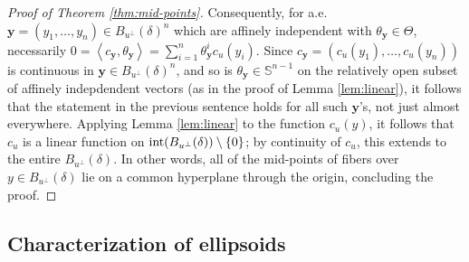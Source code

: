 \documentclass[11pt]{article}
\theoremstyle{definition}
\theoremstyle{proof}
\DeclareMathOperator{\+}{\mathop{\tilde{+}}}
\DeclareMathOperator{\interior}{\textnormal{int}}
\newcommand{\scalar}[1]{\left \langle #1 \right \rangle}
\renewcommand{\S}{\mathbb{S}}
\newcommand{\y}{\mathbf{y}}
\numberwithin{equation}{section}
\numberwithin{equation}{section}
\begin{document}
\begin{proof}[Proof of Theorem \ref{thm:mid-points}]
Consequently, for a.e.~$\y = (y_1,\ldots,y_n) \in B_{u^\perp}(\delta)^n$ which are affinely independent with $\theta_\y \in \Theta$, necessarily $0 = \scalar{c_\y , \theta_\y} = \sum_{i=1}^n \theta_\y^i c_u(y_i)$. Since $c_\y = (c_u(y_1),\ldots,c_u(y_n))$ is continuous in $\y \in B_{u^\perp}(\delta)^n$, and so is $\theta_\y \in \S^{n-1}$ on the relatively open subset of affinely indepdendent vectors (as in the proof of Lemma \ref{lem:linear}), it follows that the statement in the previous sentence holds for all such $\y$'s, not just almost everywhere. Applying Lemma \ref{lem:linear} to the function $c_u(y)$, it follows that $c_u$ is a linear function on $\interior (B_{u^\perp}(\delta))\setminus \{0\}$; by continuity of $c_u$, this extends to the entire $B_{u^\perp}(\delta)$. In other words, all of the mid-points of fibers over $y \in B_{u^\perp}(\delta)$ lie on a common hyperplane through the origin, concluding the proof. 
\end{proof}

\subsection{Characterization of ellipsoids}
\end{document}
